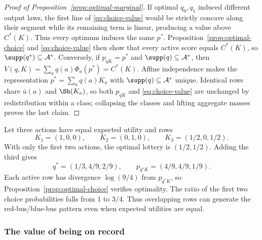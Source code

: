 \begin{proof}[Proof of Proposition~\ref{prop:optimal-marginal}]
If optimal $q_0,q_1$ induced different output laws, the first line of
\eqref{eq:choice-value} would be strictly concave along their segment while
its remaining term is linear, producing a value above $C^*(K)$.  Thus every
optimum induces the same $p^*$.  Proposition~\ref{prop:optimal-choice} and
\eqref{eq:choice-value} then show that every active score equals $C^*(K)$,
so $\supp(q^*)\subseteq\mathcal A^*$.  Conversely, if $p_{qK}=p^*$ and
$\supp(q)\subseteq\mathcal A^*$, then
$V(q,K)=\sum_aq(a)\Phi_a(p^*)=C^*(K)$.
Affine independence makes the representation $p^*=\sum_aq(a)K_a$ with $\supp(q)\subseteq\mathcal A^*$ unique.
Identical rows share $\bar u(a)$ and $\Sh(K_a)$, so both $p_{qK}$ and
\eqref{eq:choice-value} are
unchanged by redistribution within a class; collapsing the classes and lifting aggregate masses proves the last
claim.
\end{proof}

\begin{remark}\label{rem:overlap-iia-example}
Let three actions have equal expected utility and rows
\[
 K_1=(1,0,0),\qquad K_2=(0,1,0),\qquad K_3=(1/2,0,1/2).
\]
With only the first two actions, the optimal lottery is $(1/2,1/2)$.  Adding the third gives
\[
 q^*=(1/3,4/9,2/9),\qquad p_{q^*K}=(4/9,4/9,1/9).
\]
Each active row has divergence $\log(9/4)$ from $p_{q^*K}$, so
Proposition~\ref{prop:optimal-choice} verifies optimality.  The ratio of the first two choice probabilities falls
from $1$ to $3/4$.  Thus overlapping rows can generate the red-bus/blue-bus pattern even when expected utilities
are equal.
\end{remark}

\subsubsection{The value of being on record}
\label{app:record-value-proofs}

